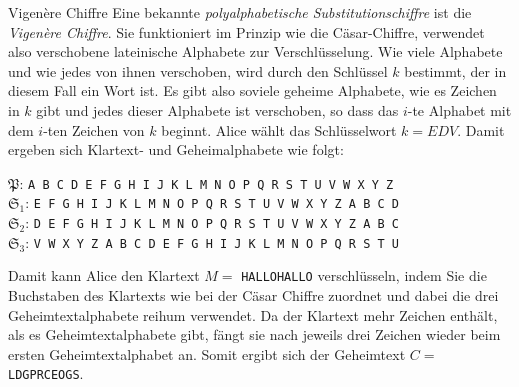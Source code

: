 \documentclass[german]{spicker}
\begin{document}
\begin{example}{Vigenère Chiffre}
    Eine bekannte \emph{polyalphabetische Substitutionschiffre} ist die \emph{Vigenère Chiffre}.
    Sie funktioniert im Prinzip wie die Cäsar-Chiffre, verwendet also verschobene
    lateinische Alphabete zur Verschlüsselung. Wie viele Alphabete und wie
    jedes von ihnen verschoben, wird durch den Schlüssel $k$ bestimmt, der in diesem
    Fall ein Wort ist. Es gibt also soviele geheime Alphabete, wie es Zeichen
    in $k$ gibt und jedes dieser Alphabete ist verschoben, so dass das $i$-te Alphabet
    mit dem $i$-ten Zeichen von $k$ beginnt.
    Alice wählt das Schlüsselwort $k = EDV$. Damit ergeben sich Klartext- und
    Geheimalphabete wie folgt:

    \begin{center}
        $\mathfrak{P}$: \texttt{A B C D E F G H I J K L M N O P Q R S T U V W X Y Z}\\
        $\mathfrak{S}_1$: \texttt{E F G H I J K L M N O P Q R S T U V W X Y Z A B C D}\\
        $\mathfrak{S}_2$: \texttt{D E F G H I J K L M N O P Q R S T U V W X Y Z A B C}\\
        $\mathfrak{S}_3$: \texttt{V W X Y Z A B C D E F G H I J K L M N O P Q R S T U}\\
    \end{center}

    Damit kann Alice den Klartext $M =$ \texttt{HALLOHALLO} verschlüsseln, indem Sie
    die Buchstaben des Klartexts wie bei der Cäsar Chiffre zuordnet und dabei die
    drei Geheimtextalphabete reihum verwendet. Da der Klartext mehr Zeichen
    enthält, als es Geheimtextalphabete gibt, fängt sie nach jeweils drei Zeichen
    wieder beim ersten Geheimtextalphabet an. Somit ergibt sich der Geheimtext
    $C =$ \texttt{LDGPRCEOGS}.
\end{example}
\end{document}
